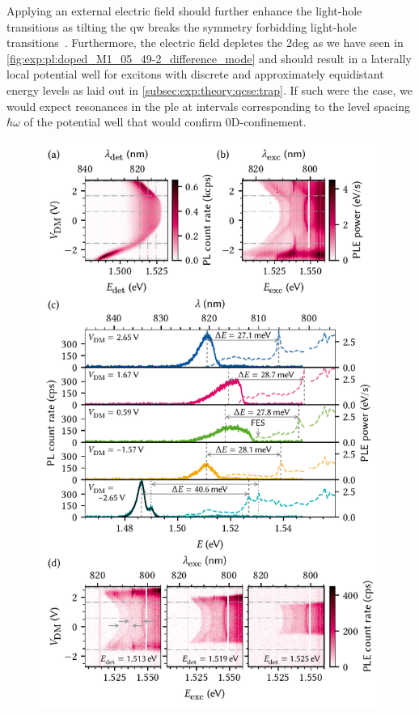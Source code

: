 Applying an external electric field should further enhance the light-hole transitions as tilting the \gls{qw} breaks the symmetry forbidding light-hole transitions~\cite{Collins1986,Collins1987}.
Furthermore, the electric field depletes the \gls{2deg} as we have seen in \cref{fig:exp:pl:doped_M1_05_49-2_difference_mode} and should result in a laterally local potential well for excitons with discrete and approximately equidistant energy levels as laid out in \cref{subsec:exp:theory:qcse:trap}.
If such were the case, we would expect resonances in the \gls{ple} at intervals corresponding to the level spacing $\hbar\omega$ of the potential well that would confirm 0D-confinement.

\begin{figure}
    \centering
    \includegraphics{img/pdf/experiment/doped_M1_05_49-2_ple}

\end{figure}

